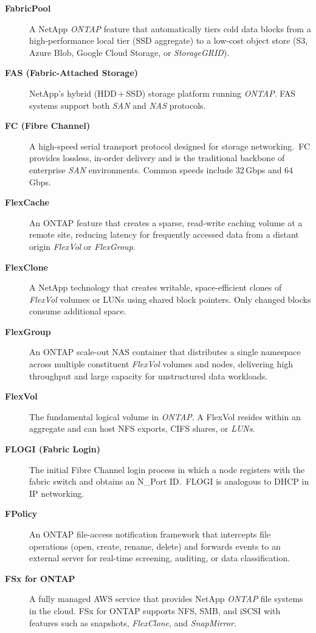 \begin{description}

\item[\textbf{FabricPool}]
A NetApp \textit{ONTAP} feature that automatically tiers cold data blocks
from a high-performance local tier (SSD aggregate) to a low-cost object
store (S3, Azure Blob, Google Cloud Storage, or \textit{StorageGRID}).

\item[\textbf{FAS (Fabric-Attached Storage)}]
NetApp's hybrid (HDD\,+\,SSD) storage platform running \textit{ONTAP}.
FAS systems support both \textit{SAN} and \textit{NAS} protocols.

\item[\textbf{FC (Fibre Channel)}]
A high-speed serial transport protocol designed for storage networking.\ FC
provides lossless, in-order delivery and is the traditional backbone of
enterprise \textit{SAN} environments. Common speeds include 32\,Gbps and
64\,Gbps.

\item[\textbf{FlexCache}]
An ONTAP feature that creates a sparse, read-write caching volume at a
remote site, reducing latency for frequently accessed data from a distant
origin \textit{FlexVol} or \textit{FlexGroup}.

\item[\textbf{FlexClone}]
A NetApp technology that creates writable, space-efficient clones of
\textit{FlexVol} volumes or LUNs using shared block pointers. Only changed
blocks consume additional space.

\item[\textbf{FlexGroup}]
An ONTAP scale-out NAS container that distributes a single namespace across
multiple constituent \textit{FlexVol} volumes and nodes, delivering high
throughput and large capacity for unstructured data workloads.

\item[\textbf{FlexVol}]
The fundamental logical volume in \textit{ONTAP}. A FlexVol resides within
an aggregate and can host NFS exports, CIFS shares, or \textit{LUNs}.

\item[\textbf{FLOGI (Fabric Login)}]
The initial Fibre Channel login process in which a node registers with the
fabric switch and obtains an N\_Port ID.\ FLOGI is analogous to DHCP in IP
networking.

\item[\textbf{FPolicy}]
An ONTAP file-access notification framework that intercepts file operations
(open, create, rename, delete) and forwards events to an external server
for real-time screening, auditing, or data classification.

\item[\textbf{FSx for ONTAP}]
A fully managed AWS service that provides NetApp \textit{ONTAP} file systems
in the cloud. FSx for ONTAP supports NFS, SMB, and iSCSI with features
such as snapshots, \textit{FlexClone}, and \textit{SnapMirror}.

\end{description}

